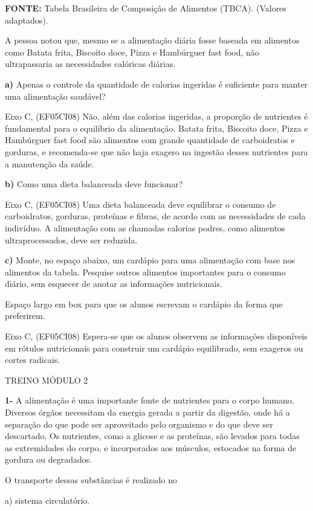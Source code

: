 \textbf{FONTE:} Tabela Brasileira de Composição de Alimentos (TBCA).
(Valores adaptados).

A pessoa notou que, mesmo se a alimentação diária fosse baseada em
alimentos como Batata frita, Biscoito doce, Pizza e Hambúrguer fast
food, não ultrapassaria as necessidades calóricas diárias.

\textbf{a)} Apenas o controle da quantidade de calorias ingeridas é
suficiente para manter uma alimentação saudável?

Eixo C, (EF05CI08) Não, além das calorias ingeridas, a proporção de
nutrientes é fundamental para o equilíbrio da alimentação. Batata frita,
Biscoito doce, Pizza e Hambúrguer fast food são alimentos com grande
quantidade de carboidratos e gorduras, e recomenda-se que não haja
exagero na ingestão desses nutrientes para a manutenção da saúde.

\textbf{b)} Como uma dieta balanceada deve funcionar?

Eixo C, (EF05CI08) Uma dieta balanceada deve equilibrar o consumo de
carboidratos, gorduras, proteínas e fibras, de acordo com as
necessidades de cada indivíduo. A alimentação com as chamadas calorias
podres, como alimentos ultraprocessados, deve ser reduzida.

\textbf{c)} Monte, no espaço abaixo, um cardápio para uma alimentação
com base nos alimentos da tabela. Pesquise outros alimentos importantes
para o consumo diário, sem esquecer de anotar as informações
nutricionais.

Espaço largo em box para que os alunos escrevam o cardápio da forma que
preferirem.

Eixo C, (EF05CI08) Espera-se que os alunos observem as informações
disponíveis em rótulos nutricionais para construir um cardápio
equilibrado, sem exageros ou cortes radicais.

\protect\hypertarget{_fmbk3hemyusi}{}{}TREINO MÓDULO 2

\textbf{1-} A alimentação é uma importante fonte de nutrientes para o
corpo humano. Diversos órgãos necessitam da energia gerada a partir da
digestão, onde há a separação do que pode ser aproveitado pelo organismo
e do que deve ser descartado. Os nutrientes, como a glicose e as
proteínas, são levados para todas as extremidades do corpo, e
incorporados aos músculos, estocados na forma de gordura ou degradados.

O transporte dessas substâncias é realizado no

a) sistema circulatório.


